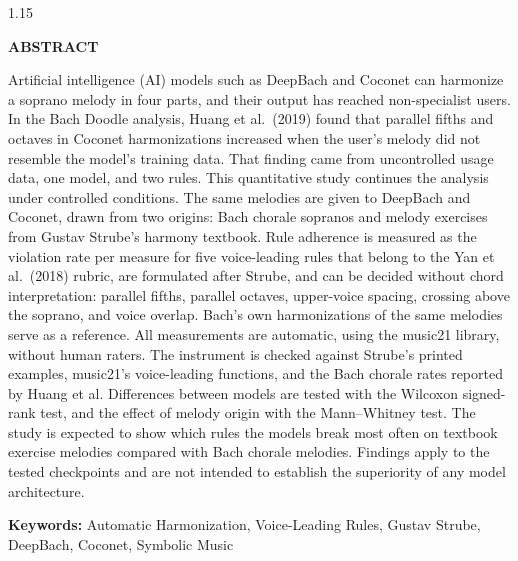 \newpage
{}
{}
\begin{spacing}{1.15}
\begin{center}
    \textbf{ABSTRACT}
\end{center}

Artificial intelligence (AI) models such as DeepBach and Coconet can harmonize a soprano melody in four parts, and their output has reached non-specialist users. In the Bach Doodle analysis, Huang et al.\ (2019) found that parallel fifths and octaves in Coconet harmonizations increased when the user's melody did not resemble the model's training data. That finding came from uncontrolled usage data, one model, and two rules. This quantitative study continues the analysis under controlled conditions. The same melodies are given to DeepBach and Coconet, drawn from two origins: Bach chorale sopranos and melody exercises from Gustav Strube's harmony textbook. Rule adherence is measured as the violation rate per measure for five voice-leading rules that belong to the Yan et al.\ (2018) rubric, are formulated after Strube, and can be decided without chord interpretation: parallel fifths, parallel octaves, upper-voice spacing, crossing above the soprano, and voice overlap. Bach's own harmonizations of the same melodies serve as a reference. All measurements are automatic, using the music21 library, without human raters. The instrument is checked against Strube's printed examples, music21's voice-leading functions, and the Bach chorale rates reported by Huang et al. Differences between models are tested with the Wilcoxon signed-rank test, and the effect of melody origin with the Mann--Whitney test. The study is expected to show which rules the models break most often on textbook exercise melodies compared with Bach chorale melodies. Findings apply to the tested checkpoints and are not intended to establish the superiority of any model architecture.\par

\textbf{Keywords:} Automatic Harmonization, Voice-Leading Rules, Gustav Strube, DeepBach, Coconet, Symbolic Music
\end{spacing}
\newpage

